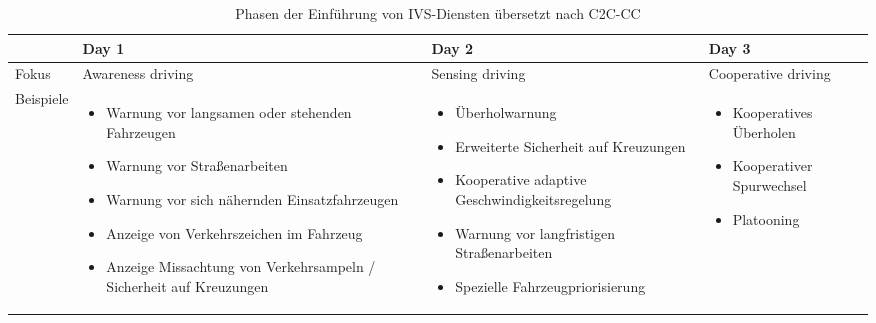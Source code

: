 \begin{table}[h!]
	\centering
	\begin{tabular}{|m{4em}||m{10em}|m{10em}|m{8em}|} 
		\hline
		& \textbf{Day 1} & \textbf{Day 2} & \textbf{Day 3} \\ [1ex]
		\hline
		Fokus & Awareness driving & Sensing driving & Cooperative driving \\ [1ex]
		\hline 
		Beispiele & \begin{itemize}[leftmargin=0.3cm] \item Warnung vor langsamen oder stehenden Fahrzeugen
		
		\item Warnung vor Straßenarbeiten
		
		\item Warnung vor sich nähernden Einsatzfahrzeugen
		
		\item Anzeige von Verkehrszeichen im Fahrzeug
		
		\item Anzeige Missachtung von Verkehrsampeln / Sicherheit auf Kreuzungen 
		
	\end{itemize} & 
	\begin{itemize}[leftmargin=0.3cm] \item Überholwarnung
	
	\item Erweiterte Sicherheit auf Kreuzungen 
	
	\item Kooperative adaptive Geschwindigkeitsregelung
	
	\item Warnung vor langfristigen Straßenarbeiten
	
	\item Spezielle Fahrzeugpriorisierung
	
	\end{itemize} & 
	\begin{itemize}[leftmargin=0.3cm] \item Kooperatives Überholen
	
	\item Kooperativer Spurwechsel
	
	\item Platooning\footnotemark
	
	\end{itemize} \\ 
		\hline
	\end{tabular}
	\caption[Phasen der Einführung von IVS-Diensten \nocite{Car2Car}]{Phasen der Einführung von IVS-Diensten übersetzt nach C2C-CC \footnotemark}
	\label{table:1}
\end{table}

